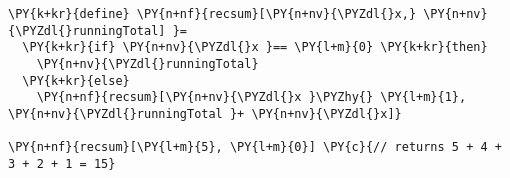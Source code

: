 \begin{Verbatim}[commandchars=\\\{\}]
\PY{k+kr}{define} \PY{n+nf}{recsum}[\PY{n+nv}{\PYZdl{}x,} \PY{n+nv}{\PYZdl{}runningTotal] }=
  \PY{k+kr}{if} \PY{n+nv}{\PYZdl{}x }== \PY{l+m}{0} \PY{k+kr}{then}
    \PY{n+nv}{\PYZdl{}runningTotal}
  \PY{k+kr}{else}
    \PY{n+nf}{recsum}[\PY{n+nv}{\PYZdl{}x }\PYZhy{} \PY{l+m}{1}, \PY{n+nv}{\PYZdl{}runningTotal }+ \PY{n+nv}{\PYZdl{}x]}

\PY{n+nf}{recsum}[\PY{l+m}{5}, \PY{l+m}{0}] \PY{c}{// returns 5 + 4 + 3 + 2 + 1 = 15}
\end{Verbatim}
